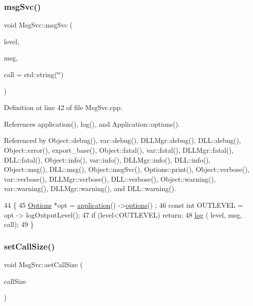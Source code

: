 \subsubsection{\texorpdfstring{msg\+Svc()}{msgSvc()}}
{\footnotesize\ttfamily void Msg\+Svc\+::msg\+Svc (\begin{DoxyParamCaption}\item[{\hyperlink{classMsgSvc_ae671eb7301996cd049d2da8a65925926}{Msg\+Svc\+::\+Msg\+Level}}]{level,  }\item[{std\+::string}]{msg,  }\item[{std\+::string}]{call = {\ttfamily std\+:\+:string(\char`\"{}\char`\"{})} }\end{DoxyParamCaption})}



Definition at line 42 of file Msg\+Svc.\+cpp.



References application(), log(), and Application\+::options().



Referenced by Object\+::debug(), var\+::debug(), D\+L\+L\+Mgr\+::debug(), D\+L\+L\+::debug(), Object\+::error(), export\+\_\+base(), Object\+::fatal(), var\+::fatal(), D\+L\+L\+Mgr\+::fatal(), D\+L\+L\+::fatal(), Object\+::info(), var\+::info(), D\+L\+L\+Mgr\+::info(), D\+L\+L\+::info(), Object\+::msg(), D\+L\+L\+::msg(), Object\+::msg\+Svc(), Options\+::print(), Object\+::verbose(), var\+::verbose(), D\+L\+L\+Mgr\+::verbose(), D\+L\+L\+::verbose(), Object\+::warning(), var\+::warning(), D\+L\+L\+Mgr\+::warning(), and D\+L\+L\+::warning().


\begin{DoxyCode}
44                                      \{
45   \hyperlink{classOptions}{Options} *opt = \hyperlink{Tools_8h_a27885a3c35afe79029fb830f32f66458}{application}() ->\hyperlink{classApplication_ada7cc0e8db586985f1435aee0c79f47d}{options}() ;
46   \textcolor{keyword}{const} \textcolor{keywordtype}{int} OUTLEVEL = opt -> logOutputLevel(); 
47   \textcolor{keywordflow}{if} (level<OUTLEVEL) \textcolor{keywordflow}{return};
48   \hyperlink{classMsgSvc_ad16d082e1bed97d14344d4942664d370}{log} ( level, msg, call);  
49 \} 
\end{DoxyCode}
\mbox{\label{classMsgSvc_a50854fb6f9df98bc170f690941747b61}} 
\subsubsection{\texorpdfstring{set\+Call\+Size()}{setCallSize()}}
{\footnotesize\ttfamily void Msg\+Svc\+::set\+Call\+Size (\begin{DoxyParamCaption}\item[{int}]{call\+Size }\end{DoxyParamCaption})\hspace{0.3cm}{\ttfamily [inline]}}



